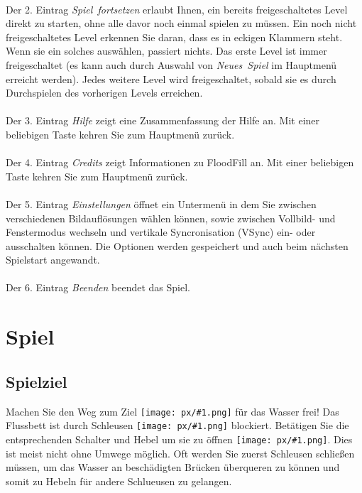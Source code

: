 \documentclass[oneside,12pt]{scrartcl}
\newcommand{\ui}[1]{\mbox{\textit{#1}}}
\newcommand{\inlpx}[1]{\texttt{[image: px/\#1.png]}}
\begin{document}
\paragraph{} Der 2. Eintrag \ui{Spiel fortsetzen} erlaubt Ihnen, ein bereits freigeschaltetes Level direkt zu starten, ohne alle davor noch einmal spielen zu müssen. Ein noch nicht freigeschaltetes Level erkennen Sie daran, dass es in eckigen Klammern steht. Wenn sie ein solches auswählen, passiert nichts. Das erste Level ist immer freigeschaltet (es kann auch durch Auswahl von \ui{Neues Spiel} im Hauptmenü erreicht werden). Jedes weitere Level wird freigeschaltet, sobald sie es durch Durchspielen des vorherigen Levels erreichen.

\paragraph{} Der 3. Eintrag \ui{Hilfe} zeigt eine Zusammenfassung der Hilfe an. Mit einer beliebigen Taste kehren Sie zum Hauptmenü zurück.

\paragraph{} Der 4. Eintrag \ui{Credits} zeigt Informationen zu FloodFill an. Mit einer beliebigen Taste kehren Sie zum Hauptmenü zurück.

\paragraph{} Der 5. Eintrag \ui{Einstellungen} öffnet ein Untermenü in dem Sie zwischen verschiedenen Bildauflösungen wählen können, sowie zwischen Vollbild- und Fenstermodus wechseln und vertikale Syncronisation (VSync) ein- oder ausschalten können. Die Optionen werden gespeichert und auch beim nächsten Spielstart angewandt.

\paragraph{} Der 6. Eintrag \ui{Beenden} beendet das Spiel.


\section{Spiel}
\subsection{Spielziel}
Machen Sie den Weg zum Ziel \inlpx{goal} für das Wasser frei! Das Flussbett ist durch Schleusen \inlpx{lock} blockiert. Betätigen Sie die entsprechenden Schalter und Hebel um sie zu öffnen \inlpx{lock_open}. Dies ist meist nicht ohne Umwege möglich. Oft werden Sie zuerst Schleusen schließen müssen, um das Wasser an beschädigten Brücken überqueren zu können und somit zu Hebeln für andere Schlueusen zu gelangen.
\end{document}
